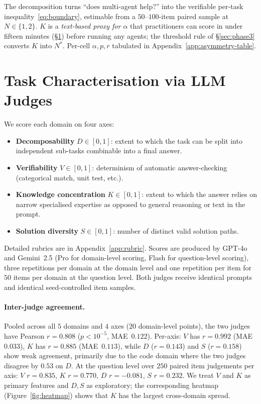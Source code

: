 \documentclass{article}
\begin{document}
The decomposition turns ``does multi-agent help?'' into the verifiable per-task inequality~\eqref{eq:boundary}, estimable from a $50$--$100$-item paired sample at $N{\in}\{1,2\}$. $K$ is a \emph{text-based proxy for $\alpha$} that practitioners can score in under fifteen minutes (\S\ref{sec:features}) before running any agents; the threshold rule of \S\ref{sec:phase3} converts $K$ into $N^{*}$. Per-cell $\alpha, p, r$ tabulated in Appendix~\ref{app:asymmetry-table}.


\section{Task Characterisation via LLM Judges}
\label{sec:features}

We score each domain on four axes:

\begin{itemize}
\item \textbf{Decomposability} $D \in [0,1]$: extent to which the task can be split into independent sub-tasks combinable into a final answer.
\item \textbf{Verifiability} $V \in [0,1]$: determinism of automatic answer-checking (categorical match, unit test, etc.).
\item \textbf{Knowledge concentration} $K \in [0,1]$: extent to which the answer relies on narrow specialised expertise as opposed to general reasoning or text in the prompt.
\item \textbf{Solution diversity} $S \in [0,1]$: number of distinct valid solution paths.
\end{itemize}

Detailed rubrics are in Appendix~\ref{app:rubric}. Scores are produced by GPT-4o and Gemini~2.5 (Pro for domain-level scoring, Flash for question-level scoring), three repetitions per domain at the domain level and one repetition per item for $50$ items per domain at the question level. Both judges receive identical prompts and identical seed-controlled item samples.

\paragraph{Inter-judge agreement.} Pooled across all $5$ domains and $4$ axes ($20$ domain-level points), the two judges have Pearson $r = 0.808$ ($p < 10^{-5}$, MAE~$0.122$). Per-axis: $V$ has $r=0.992$ (MAE~$0.033$), $K$ has $r=0.885$ (MAE~$0.113$), while $D$ ($r=0.143$) and $S$ ($r=0.158$) show weak agreement, primarily due to the code domain where the two judges disagree by $0.53$ on $D$. At the question level over $250$ paired item judgements per axis: $V$ $r=0.835$, $K$ $r=0.770$, $D$ $r=-0.081$, $S$ $r=0.232$. We treat $V$ and $K$ as primary features and $D, S$ as exploratory; the corresponding heatmap (Figure~\ref{fig:heatmap}) shows that $K$ has the largest cross-domain spread.
\end{document}
